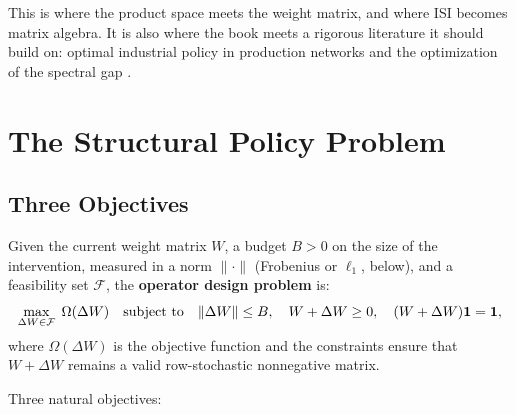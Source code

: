 \documentclass[../structural_economics_book.tex]{subfiles}
\begin{document}
This is where the product space meets the weight matrix, and where ISI becomes matrix algebra. It is also where the book meets a rigorous literature it should build on: optimal industrial policy in production networks \citep{liu2019industrial} and the optimization of the spectral gap \citep*{boyd2004fastest}.


\section{The Structural Policy Problem}
\label{ch15:sec:problem}

\subsection{Three Objectives}

\begin{definition}\label{ch15:def:operator}
Given the current weight matrix $W$, a budget $B > 0$ on the size of the intervention, measured in a norm $\|\cdot\|$ (Frobenius or $\ell_1$, below), and a feasibility set $\mathcal{F}$, the \textbf{operator design problem} is:
\begin{equation}\label{ch15:eq:operator}
\max_{\Delta W \in \mathcal{F}} \; \Omega(\Delta W) \quad \text{subject to} \quad \|\Delta W\| \leq B, \quad W + \Delta W \geq 0, \quad (W + \Delta W)\mathbf{1} = \mathbf{1},
\end{equation}
where $\Omega(\Delta W)$ is the objective function and the constraints ensure that $W + \Delta W$ remains a valid row-stochastic nonnegative matrix.
\end{definition}

Three natural objectives:
\end{document}
